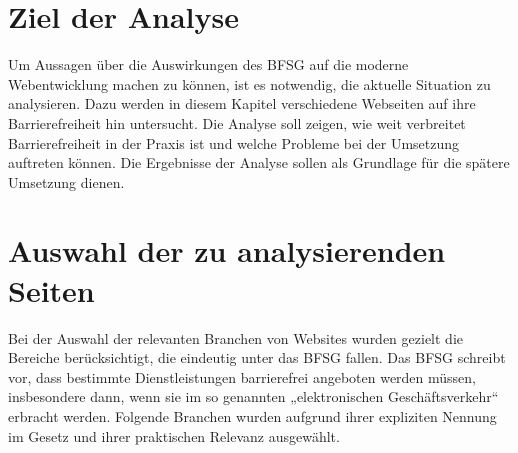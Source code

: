 \section{Ziel der Analyse}
Um Aussagen über die Auswirkungen des BFSG auf die moderne Webentwicklung machen zu können, ist es notwendig, die aktuelle Situation zu analysieren. Dazu werden in diesem Kapitel verschiedene Webseiten auf ihre Barrierefreiheit hin untersucht. Die Analyse soll zeigen, wie weit verbreitet Barrierefreiheit in der Praxis ist und welche Probleme bei der Umsetzung auftreten können. Die Ergebnisse der Analyse sollen als Grundlage für die spätere Umsetzung dienen. 
\section{Auswahl der zu analysierenden Seiten}
Bei der Auswahl der relevanten Branchen von Websites wurden gezielt die Bereiche berücksichtigt, die eindeutig unter das BFSG fallen. Das BFSG schreibt vor, dass bestimmte Dienstleistungen barrierefrei angeboten werden müssen, insbesondere dann, wenn sie im so genannten „elektronischen Geschäftsverkehr“ erbracht werden. Folgende Branchen wurden aufgrund ihrer expliziten Nennung im Gesetz \parencite[vgl.][]{bmas_bfsg1_2021} und ihrer praktischen Relevanz ausgewählt.
